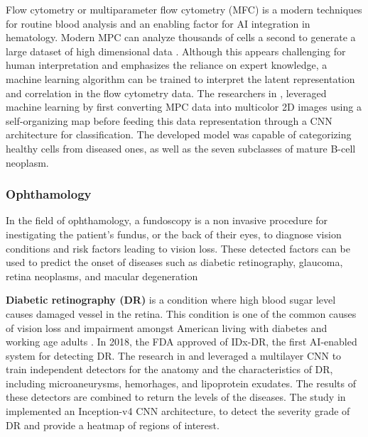 \documentclass{article}
\begin{document}
Flow cytometry or multiparameter flow cytometry (MFC) is a modern techniques for routine blood analysis and an enabling factor for AI integration in hematology.
Modern MPC can analyze thousands of cells a second to generate a large dataset of high dimensional data \cite{walter_artificial_2023}. 
Although this appears challenging for human interpretation and emphasizes the reliance on expert knowledge, a machine learning algorithm can be trained to interpret the latent representation and correlation in the flow cytometry data.
The researchers in \cite{zhao_hematologist-level_2020}, leveraged machine learning by first converting MPC data into multicolor 2D images using a self-organizing map before feeding this data representation through a CNN architecture for classification.
The developed model was capable of categorizing healthy cells from diseased ones, as well as the seven subclasses of mature B-cell neoplasm.

\subsubsection{Ophthamology}
In the field of ophthamology, a fundoscopy is a non invasive procedure for inestigating the patient's fundus, or the back of their eyes, to diagnose vision conditions and risk factors leading to vision loss.
These detected factors can be used to predict the onset of diseases such as diabetic retinography, glaucoma, retina neoplasms, and macular degeneration \cite{kumar_artificial_2023}

\textbf{Diabetic retinography (DR)} is a condition where high blood sugar level causes damaged vessel in the retina. 
This condition is one of the common causes of vision loss and impairment amongst American living with diabetes and working age adults \cite{commissioner_fda_2020,abramoff_pivotal_2018}.
In 2018, the FDA approved of IDx-DR, the first AI-enabled system for detecting DR.
The research in \cite{abramoff_improved_2016} and \cite{abramoff_pivotal_2018} leveraged a multilayer CNN to train independent detectors for the anatomy and the characteristics of DR, including microaneurysms, hemorhages, and lipoprotein exudates.
The results of these detectors are combined to return the levels of the diseases. 
The study in \cite{sayres_using_2019} implemented an Inception-v4 CNN architecture, to detect the severity grade of DR and provide a heatmap of regions of interest.
\end{document}
